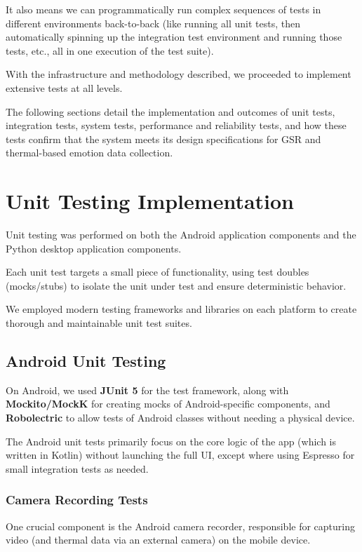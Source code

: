 {{It also means we can programmatically run complex sequences of tests in different
environments back-to-back (like running all unit tests, then automatically spinning
up the integration test environment and running those tests, etc., all in one
execution of the test suite).

With the infrastructure and methodology described, we proceeded to implement
extensive tests at all levels.

The following sections detail the implementation and outcomes of unit tests,
integration tests, system tests, performance and reliability tests, and how these
tests confirm that the system meets its design specifications for GSR and
thermal-based emotion data collection.

\section{Unit Testing Implementation}

Unit testing was performed on both the Android application components and the Python
desktop application components.

Each unit test targets a small piece of functionality, using test doubles
(mocks/stubs) to isolate the unit under test and ensure deterministic behavior.

We employed modern testing frameworks and libraries on each platform to create
thorough and maintainable unit test suites.

\subsection{Android Unit Testing}

On Android, we used \textbf{JUnit 5}
 for the test framework, along with \textbf{Mockito/MockK}
 for creating mocks of Android-specific components, and \textbf{Robolectric}
 to allow tests of Android classes without needing a physical device.

The Android unit tests primarily focus on the core logic of the app (which is written
in Kotlin) without launching the full UI, except where using Espresso for small
integration tests as needed.

\subsubsection{Camera Recording Tests}

One crucial component is the Android camera recorder, responsible for capturing video
(and thermal data via an external camera) on the mobile device.

}}
